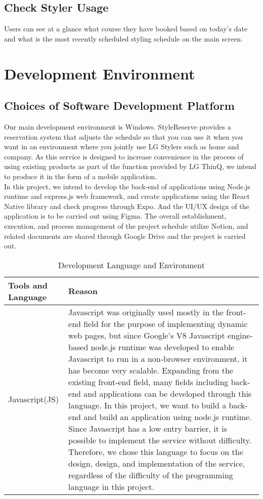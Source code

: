 \documentclass[conference]{IEEEtran}
\begin{document}
\subsection{Check Styler Usage}
Users can see at a glance what course they have booked based on today's date and what is the most recently scheduled styling schedule on the main screen.\\

\section{Development Environment}
\subsection{Choices of Software Development Platform}
Our main development environment is Windows. StyleReserve provides a reservation system that adjusts the schedule so that you can use it when you want in an environment where you jointly use LG Stylers such as home and company. As this service is designed to increase convenience in the process of using existing products as part of the function provided by LG ThinQ, we intend to produce it in the form of a mobile application. \\

In this project, we intend to develop the back-end of applications using Node.js runtime and express.js web framework, and create applications using the React Native library and check progress through Expo. And the UI/UX design of the application is to be carried out using Figma. The overall establishment, execution, and process management of the project schedule utilize Notion, and related documents are shared through Google Drive and the project is carried out.\\

\begin{table}[htbp]
\caption{Development Language and Environment}
\begin{tabular}{| p{1.7cm}|p{6.4cm} |}
    \hline
    Tools and Language& Reason \\
    \hline
    Javascript(JS) & Javascript was originally used mostly in the front-end field for the purpose of implementing dynamic web pages, but since Google's V8 Javascript engine-based node.js runtime was developed to enable Javascript to run in a non-browser environment, it has become very scalable. Expanding from the existing front-end field, many fields including back-end and applications can be developed through this language.
    In this project, we want to build a back-end and build an application using node.js runtime. Since Javascript has a low entry barrier, it is possible to implement the service without difficulty. Therefore, we chose this language to focus on the design, design, and implementation of the service, regardless of the difficulty of the programming language in this project.\\
    \hline
\end{tabular}
\end{table}
\end{document}
